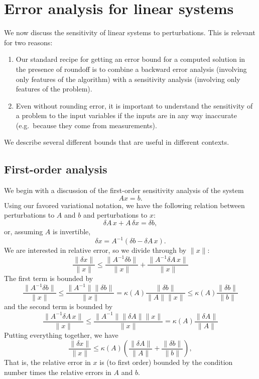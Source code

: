 \section{Error analysis for linear systems}

We now discuss the sensitivity of linear systems to perturbations.
This is relevant for two reasons:
\begin{enumerate}
\item Our standard recipe for getting an error bound for a computed
  solution in the presence of roundoff is to combine a backward
  error analysis (involving only features of the algorithm) with
  a sensitivity analysis (involving only features of the problem).
\item Even without rounding error, it is important to understand
  the sensitivity of a problem to the input variables if the inputs
  are in any way inaccurate (e.g.~because they come from measurements).
\end{enumerate}
We describe several different bounds that are useful in different
contexts.

\subsection{First-order analysis}

We begin with a discussion of the first-order sensitivity analysis
of the system
\[
  Ax = b.
\]
Using our favored variational notation, we have the following relation
between perturbations to $A$ and $b$ and perturbations to $x$:
\[
  \delta A \, x + A \, \delta x = \delta b,
\]
or, assuming $A$ is invertible,
\[
  \delta x = A^{-1} (\delta b - \delta A \, x).
\]
We are interested in relative error, so we divide through by $\|x\|$:
\[
  \frac{\|\delta x\|}{\|x\|} \leq
  \frac{\|A^{-1} \delta b \|}{\|x\|} + \frac{\|A^{-1} \delta A \, x\|}{\|x\|}
\]
The first term is bounded by
\[
  \frac{\|A^{-1} \delta b \|}{\|x\|} \leq
  \frac{\|A^{-1}\| \|\delta b\|}{\|x\|} =
  \kappa(A) \frac{\|\delta b\|}{\|A\| \|x\|} \leq
  \kappa(A) \frac{\|\delta b\|}{\|b\|}
\]
and the second term is bounded by
\[
  \frac{\|A^{-1} \delta A \, x\|}{\|x\|} \leq
  \frac{\|A^{-1} \| \|\delta A\| \|x\|}{\|x\|} =
  \kappa(A) \frac{\|\delta A\|}{\|A\|}
\]
Putting everything together, we have
\[
  \frac{\|\delta x\|}{\|x\|} \leq\kappa(A)
    \left( \frac{\|\delta A\|}{\|A\|} + \frac{\|\delta b\|}{\|b\|} \right),
\]
That is, the relative error in $x$ is (to first order) bounded by the
condition number times the relative errors in $A$ and $b$.

